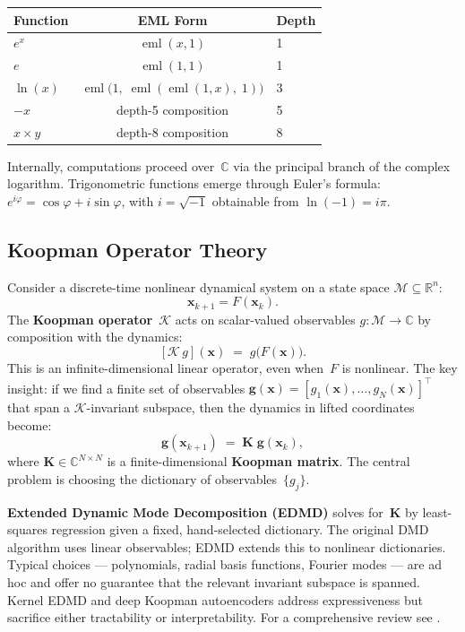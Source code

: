 \documentclass[11pt]{article}
\DeclareMathOperator{\eml}{eml}
\newcommand{\bx}{\mathbf{x}}
\newcommand{\bg}{\mathbf{g}}
\newcommand{\bK}{\mathbf{K}}
\newcommand{\R}{\mathbb{R}}
\newcommand{\C}{\mathbb{C}}
\newcommand{\cK}{\mathcal{K}}
\newcommand{\cM}{\mathcal{M}}
\begin{document}
\begin{center}
\begin{tabular}{lcl}
\toprule
Function & EML Form & Depth \\
\midrule
$e^x$ & $\eml(x, 1)$ & 1 \\
$e$ & $\eml(1, 1)$ & 1 \\
$\ln(x)$ & $\eml\!\bigl(1,\;\eml(\eml(1, x),\; 1)\bigr)$ & 3 \\
$-x$ & depth-5 composition & 5 \\
$x \times y$ & depth-8 composition & 8 \\
\bottomrule
\end{tabular}
\end{center}

Internally, computations proceed over~$\C$ via the principal branch of the complex
logarithm.  Trigonometric functions emerge through Euler's formula:
$e^{i\varphi} = \cos\varphi + i\sin\varphi$, with $i = \sqrt{-1}$ obtainable from
$\ln(-1) = i\pi$.


\subsection{Koopman Operator Theory}
\label{sec:koopman}

Consider a discrete-time nonlinear dynamical system on a state space
$\cM \subseteq \R^n$:
\begin{equation}\label{eq:dynamics}
  \bx_{k+1} = F(\bx_k).
\end{equation}
The \textbf{Koopman operator}~$\cK$ acts on scalar-valued observables
$g : \cM \to \C$ by composition with the dynamics:
\begin{equation}\label{eq:koopman}
  [\cK\, g](\bx) \;=\; g\bigl(F(\bx)\bigr).
\end{equation}
This is an infinite-dimensional linear operator, even when~$F$ is nonlinear.  The
key insight: if we find a finite set of observables
$\bg(\bx) = [g_1(\bx), \ldots, g_N(\bx)]^\top$ that span a $\cK$-invariant
subspace, then the dynamics in lifted coordinates become:
\begin{equation}\label{eq:lifted}
  \bg(\bx_{k+1}) \;=\; \bK \;\bg(\bx_k),
\end{equation}
where $\bK \in \C^{N \times N}$ is a finite-dimensional \textbf{Koopman matrix}.
The central problem is choosing the dictionary of observables~$\{g_j\}$.

\textbf{Extended Dynamic Mode Decomposition (EDMD)} \citep{williams2015} solves
for~$\bK$ by least-squares regression given a fixed, hand-selected dictionary.
The original DMD algorithm \citep{schmid2010,tu2014} uses linear observables;
EDMD extends this to nonlinear dictionaries.  Typical choices --- polynomials,
radial basis functions, Fourier modes --- are ad hoc and offer no guarantee that
the relevant invariant subspace is spanned.  Kernel EDMD
\citep{williams2015kernel} and deep Koopman autoencoders \citep{lusch2018,otto2019}
address expressiveness but sacrifice either tractability or interpretability.
For a comprehensive review see \citet{brunton2022modern}.
\end{document}
